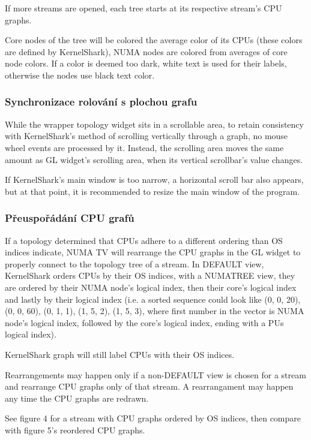 \begin{code}
If more streams are opened, each tree starts at its respective stream's CPU
graphs.

Core nodes of the tree will be colored the average color of its CPUs (these colors
are defined by KernelShark), NUMA nodes are colored from averages of core node
colors. If a color is deemed too dark, white text is used for their labels,
otherwise the nodes use black text color.

\subsubsection{Synchronizace rolování s plochou grafu}

While the wrapper topology widget sits in a scrollable area, to retain consistency with
KernelShark's method of scrolling vertically through a graph, no mouse wheel events
are processed by it. Instead, the scrolling area moves the same amount as GL widget's
scrolling area, when its vertical scrollbar's value changes.

If KernelShark's main window is too narrow, a horizontal scroll bar also appears, but
at that point, it is recommended to resize the main window of the program.

\subsubsection{Přeuspořádání CPU grafů}

If a topology determined that CPUs adhere to a different ordering than OS indices indicate,
NUMA TV will rearrange the CPU graphs in the GL widget to properly connect to the topology tree
of a stream. In DEFAULT view, KernelShark orders CPUs by their OS indices, with a NUMATREE view,
they are ordered by their NUMA node's logical index, then their core's logical index and lastly
by their logical index (i.e. a sorted sequence could look like (0, 0, 20), (0, 0, 60), (0, 1, 1),
(1, 5, 2), (1, 5, 3), where first number in the vector is NUMA node's logical index, followed
by the core's logical index, ending with a PUs logical index).

KernelShark graph will still label CPUs with their OS indices.

Rearrangements may happen only if a non-DEFAULT view is chosen for a stream and rearrange CPU
graphs only of that stream. A rearrangament may happen any time the CPU graphs are redrawn.

See figure 4 for a stream with CPU graphs ordered by OS indices, then compare with figure 5's
reordered CPU graphs.


\end{code}
